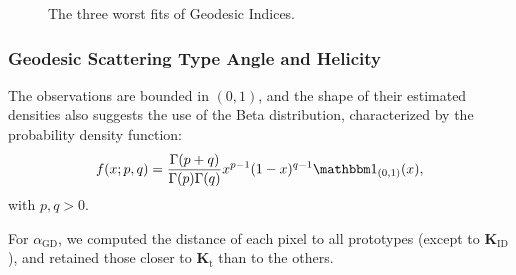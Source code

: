 \documentclass[journal]{IEEEtran}
\begin{document}
	\begin{figure}[hbt]
		\centering
		\caption{The three worst fits of Geodesic Indices.}
	\end{figure}
	
	\subsubsection{Geodesic Scattering Type Angle and Helicity}
	
	The observations are bounded in $(0,1)$, 
	and the shape of their estimated densities also suggests the use of the Beta distribution, characterized by the probability density function:
	\begin{equation}
		f(x; p, q) = \frac{\Gamma(p+q)}{\Gamma(p)\Gamma(q)} x^{p-1} (1-x)^{q-1} \mathbbm 1_{(0,1)}(x),
		\label{eq:BetaDensity}
	\end{equation}
	with $p,q>0$.
	
	For $\alpha_{\text{GD}}$, we computed the distance of each pixel to all prototypes (except to $\bm K_{\text{ID}}$), and retained those closer to $\bm K_{\text{t}}$ than to the others.
	
\end{document}
